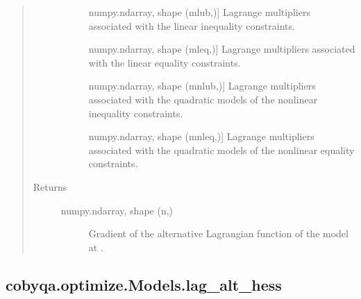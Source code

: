 \documentclass[letterpaper,10pt,english]{sphinxmanual}
\begin{document}
\begin{fulllineitems}
\begin{fulllineitems}
\begin{quote}
\begin{description}
\begin{description}
\item[{}] \leavevmode{[}numpy.ndarray, shape (mlub,){]}
\sphinxAtStartPar
Lagrange multipliers associated with the linear inequality
constraints.

\item[{}] \leavevmode{[}numpy.ndarray, shape (mleq,){]}
\sphinxAtStartPar
Lagrange multipliers associated with the linear equality
constraints.

\item[{}] \leavevmode{[}numpy.ndarray, shape (mnlub,){]}
\sphinxAtStartPar
Lagrange multipliers associated with the quadratic models of the
nonlinear inequality constraints.

\item[{}] \leavevmode{[}numpy.ndarray, shape (mnleq,){]}
\sphinxAtStartPar
Lagrange multipliers associated with the quadratic models of the
nonlinear equality constraints.

\end{description}

\item[{Returns}] \leavevmode\begin{description}
\item[{numpy.ndarray, shape (n,)}] \leavevmode
\sphinxAtStartPar
Gradient of the alternative Lagrangian function of the model at .

\end{description}

\end{description}\end{quote}

\end{fulllineitems}



\subsection{cobyqa.optimize.Models.lag\_alt\_hess}
\label{\detokenize{refs/generated/cobyqa.optimize.Models.lag_alt_hess:cobyqa-optimize-models-lag-alt-hess}}\label{\detokenize{refs/generated/cobyqa.optimize.Models.lag_alt_hess::doc}}


\end{fulllineitems}
\end{document}
